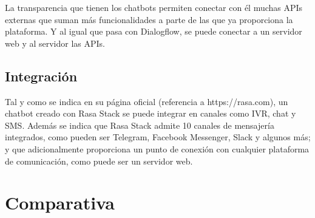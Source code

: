 La transparencia que tienen los chatbots permiten conectar con él muchas APIs externas que suman más funcionalidades a parte de las que ya proporciona la plataforma. Y al igual que pasa con Dialogflow, se puede conectar a un servidor web y al servidor las APIs.

\subsection*{Integración}

Tal y como se indica en su página oficial (referencia a https://rasa.com), un chatbot creado con Rasa Stack se puede integrar en canales como IVR, chat y SMS. Además se indica que Rasa Stack admite 10 canales de mensajería integrados, como pueden ser Telegram, Facebook Messenger, Slack y algunos más; y que adicionalmente proporciona un punto de conexión con cualquier plataforma de comunicación, como puede ser un servidor web.


\section{Comparativa}


